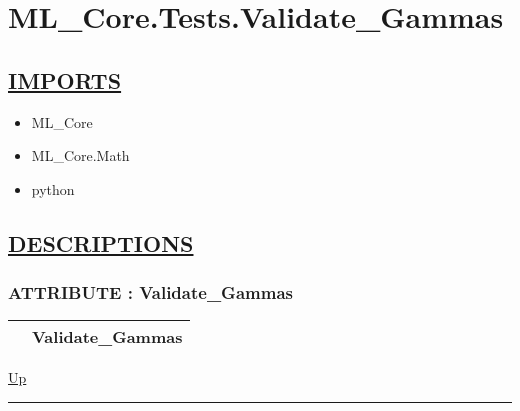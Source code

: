 \chapter*{ML\_Core.Tests.Validate\_Gammas}
\hypertarget{ecldoc:toc:ML_Core.Tests.Validate_Gammas}{}

\section*{\underline{IMPORTS}}
\begin{itemize}
\item ML\_Core
\item ML\_Core.Math
\item python
\end{itemize}

\section*{\underline{DESCRIPTIONS}}
\subsection*{ATTRIBUTE : Validate\_Gammas}
\hypertarget{ecldoc:ml_core.tests.validate_gammas}{}

{\renewcommand{\arraystretch}{1.5}
\begin{tabularx}{\textwidth}{|>{\raggedright\arraybackslash}l|X|}
\hline
\hspace{0pt} & Validate\_Gammas \\
\hline
\end{tabularx}
}

\hyperlink{ecldoc:toc:ML_Core/Tests}{Up}

\par


\rule{\textwidth}{0.4pt}
